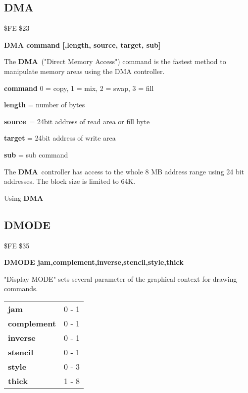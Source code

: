 
\newpage
\subsection{DMA}
\begin{description}[leftmargin=3cm,style=nextline]
\item [Token:] \$FE \$23
\item [Format:] {\bf DMA command [,length, source, target, sub]}
\item [Usage:]
   The {\bf DMA} ("Direct Memory Access") command is the fastest method
   to manipulate memory areas using the DMA controller.

   {\bf command} 0 = copy, 1 = mix, 2 = swap, 3 = fill

   {\bf length} = number of bytes

   {\bf source} = 24bit address of read area or fill byte

   {\bf target} = 24bit address of write area

   {\bf sub} = sub command

\item [Remarks:]
   The {\bf DMA} controller has access to the whole 8 MB address range
   using 24 bit addresses.
 The block size is limited to 64K.
\item [Example:] Using {\bf DMA}
\end{description}


\newpage
\subsection{DMODE}
\begin{description}[leftmargin=3cm,style=nextline]
\item [Token:] \$FE \$35
\item [Format:] {\bf DMODE jam,complement,inverse,stencil,style,thick}
\item [Usage:]
   "Display MODE" sets several parameter
   of the graphical context for drawing commands.

\ttfamily
\begin{tabular}{|l|l|}
\hline
   {\bf jam}        &  0 - 1 \\
   {\bf complement} &  0 - 1 \\
   {\bf inverse}    &  0 - 1 \\
   {\bf stencil}    &  0 - 1 \\
   {\bf style}      &  0 - 3 \\
   {\bf thick}      &  1 - 8 \\
\hline
\end{tabular}
\end{description}

